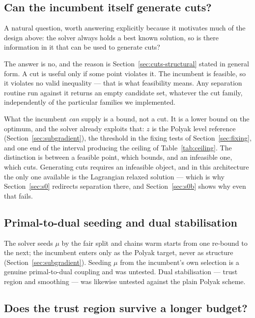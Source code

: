 \documentclass[11pt,a4paper]{article}
\begin{document}
\subsection{Can the incumbent itself generate cuts?}\label{sec:incumbent-cuts}

A natural question, worth answering explicitly because it motivates much of the
design above: the solver always holds a best known solution, so is there
information in it that can be used to generate cuts?

The answer is no, and the reason is Section~\ref{sec:cuts-structural} stated in
general form. A cut is useful only if some point violates it. The incumbent is
feasible, so it violates no valid inequality --- that is what feasibility means.
Any separation routine run against it returns an empty candidate set, whatever the
cut family, independently of the particular families we implemented.

What the incumbent \emph{can} supply is a bound, not a cut. It is a lower bound on
the optimum, and the solver already exploits that: $z$ is the Polyak level
reference (Section~\ref{sec:subgradient}), the threshold in the fixing tests of
Section~\ref{sec:fixing}, and one end of the interval producing the ceiling of
Table~\ref{tab:ceiling}. The distinction is between a feasible point, which
bounds, and an infeasible one, which cuts. Generating cuts requires an infeasible
object, and in this architecture the only one available is the Lagrangian relaxed
solution --- which is why Section~\ref{sec:s0} redirects separation there, and
Section~\ref{sec:s0b} shows why even that fails.

\subsection{Primal-to-dual seeding and dual stabilisation}\label{sec:seeding}

The solver seeds $\mu$ by the fair split and chains warm starts from one re-bound
to the next; the incumbent enters only as the Polyak target, never as structure
(Section~\ref{sec:subgradient}). Seeding $\mu$ from the incumbent's own selection
is a genuine primal-to-dual coupling and was untested. Dual stabilisation --- trust
region and smoothing --- was likewise untested against the plain Polyak scheme.



\subsection{Does the trust region survive a longer budget?}\label{sec:convergence}
\end{document}
